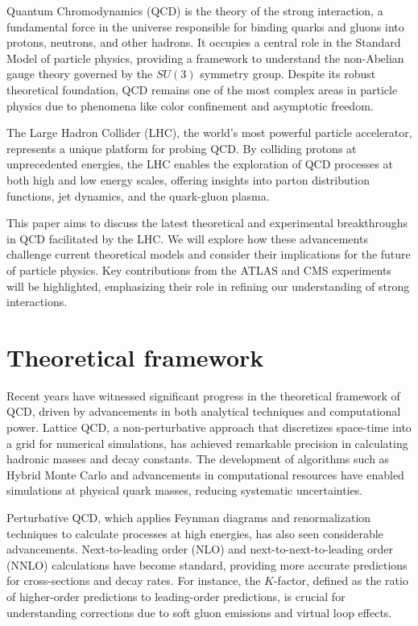 \documentclass{article}
\begin{document}
Quantum Chromodynamics (QCD) is the theory of the strong interaction, a fundamental force in the universe responsible for binding quarks and gluons into protons, neutrons, and other hadrons. It occupies a central role in the Standard Model of particle physics, providing a framework to understand the non-Abelian gauge theory governed by the $SU(3)$ symmetry group. Despite its robust theoretical foundation, QCD remains one of the most complex areas in particle physics due to phenomena like color confinement and asymptotic freedom.

The Large Hadron Collider (LHC), the world's most powerful particle accelerator, represents a unique platform for probing QCD. By colliding protons at unprecedented energies, the LHC enables the exploration of QCD processes at both high and low energy scales, offering insights into parton distribution functions, jet dynamics, and the quark-gluon plasma.

This paper aims to discuss the latest theoretical and experimental breakthroughs in QCD facilitated by the LHC. We will explore how these advancements challenge current theoretical models and consider their implications for the future of particle physics. Key contributions from the ATLAS and CMS experiments will be highlighted, emphasizing their role in refining our understanding of strong interactions.

\section{Theoretical framework}

Recent years have witnessed significant progress in the theoretical framework of QCD, driven by advancements in both analytical techniques and computational power. Lattice QCD, a non-perturbative approach that discretizes space-time into a grid for numerical simulations, has achieved remarkable precision in calculating hadronic masses and decay constants. The development of algorithms such as Hybrid Monte Carlo and advancements in computational resources have enabled simulations at physical quark masses, reducing systematic uncertainties.

Perturbative QCD, which applies Feynman diagrams and renormalization techniques to calculate processes at high energies, has also seen considerable advancements. Next-to-leading order (NLO) and next-to-next-to-leading order (NNLO) calculations have become standard, providing more accurate predictions for cross-sections and decay rates. For instance, the $K$-factor, defined as the ratio of higher-order predictions to leading-order predictions, is crucial for understanding corrections due to soft gluon emissions and virtual loop effects.
\end{document}
